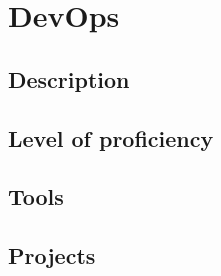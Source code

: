 \section{DevOps}

\subsection{Description}
\subsection{Level of proficiency}
\subsection{Tools}
\subsection{Projects}

\newpage
